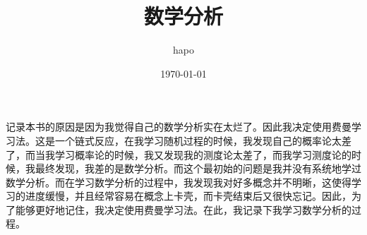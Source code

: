 \documentclass[lang=cn]{elegantbook}
\title{数学分析}
\author{hapo}
\date{\today}
\begin{document}
\maketitle
\frontmatter

\tableofcontents

\mainmatter
记录本书的原因是因为我觉得自己的数学分析实在太烂了。因此我决定使用费曼学习法。这是一个链式反应，在我学习随机过程的时候，我发现自己的概率论太差了，而当我学习概率论的时候，我又发现我的测度论太差了，而我学习测度论的时候，我最终发现，我差的是数学分析。而这个最初始的问题是我并没有系统地学过数学分析。而在学习数学分析的过程中，我发现我对好多概念并不明晰，这使得学习的进度缓慢，并且经常容易在概念上卡壳，而卡壳结束后又很快忘记。因此，为了能够更好地记住，我决定使用费曼学习法。在此，我记录下我学习数学分析的过程。








\end{document}
